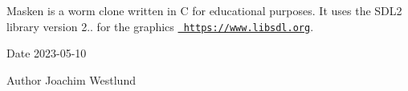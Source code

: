 Masken is a worm clone written in C for educational purposes. It uses the S\+D\+L2 library version 2.. for the graphics \href{https://www.libsdl.org}{\texttt{ https\+://www.\+libsdl.\+org}}.

\begin{DoxyDate}{Date}
2023-\/05-\/10 
\end{DoxyDate}
\begin{DoxyAuthor}{Author}
Joachim Westlund 
\end{DoxyAuthor}
